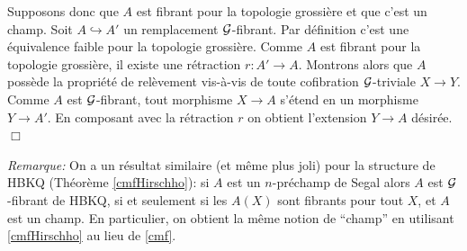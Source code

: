 \documentclass[12pt]{article}
\newcommand{\eop}{\hfill $\Box$\vspace{.1in}}
\newcommand{\Gg}{{\cal G}}
\begin{document}
Supposons donc que $A$ est fibrant pour la topologie grossi\`ere et
que c'est un champ.
Soit $A\hookrightarrow A'$ un remplacement $\Gg$-fibrant.
Par d\'efinition c'est une \'equivalence faible pour la topologie grossi\`ere.
Comme $A$ est fibrant pour la topologie grossi\`ere, il existe une r\'etraction
$r:A'\rightarrow A$. Montrons alors que $A$ poss\`ede la propri\'et\'e de
rel\`evement vis-\`a-vis de toute cofibration $\Gg$-triviale $X\rightarrow Y$.
Comme $A$ est $\Gg$-fibrant, tout morphisme $X\rightarrow A$ s'\'etend
en un morphisme $Y\rightarrow A'$. En composant avec la r\'etraction $r$
on obtient l'extension $Y\rightarrow A$ d\'esir\'ee.
\eop


{\em Remarque:} On a un r\'esultat similaire (et m\^eme plus joli) pour la
structure de HBKQ (Th\'eor\`eme \ref{cmfHirschho}): si $A$ est un
$n$-pr\'echamp de Segal alors $A$ est $\Gg$-fibrant de HBKQ, si et
seulement
si les $A(X)$ sont fibrants pour tout $X$, et $A$ est un champ. En particulier,
on obtient la m\^eme notion de ``champ'' en utilisant
\ref{cmfHirschho} au lieu de \ref{cmf}.
\end{document}
